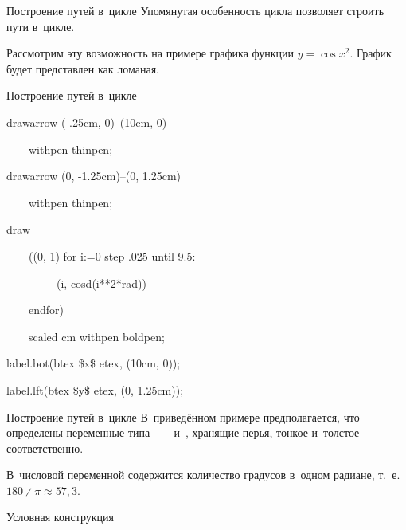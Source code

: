 \begin{frame}{Построение путей в~цикле}
Упомянутая особенность цикла  позволяет строить пути в~цикле.

Рассмотрим эту возможность на примере графика функции $y=\cos x^2$. График
будет представлен как ломаная.
\begin{center}
\end{center}
\end{frame}

\begin{frame}{Построение путей в~цикле}
\begin{programlisting}%
drawarrow (-.25cm, 0)--(10cm, 0)\par
~~~~withpen thinpen;\par
drawarrow (0, -1.25cm)--(0, 1.25cm)\par
~~~~withpen thinpen;\par
\leavevmode\par
draw\par
~~~~((0, 1) for i:=0 step .025 until 9.5:\par
~~~~~~~~--(i, cosd(i**2*rad))\par
~~~~endfor)\par
~~~~scaled cm withpen boldpen;\par
\leavevmode\par
label.bot(btex \$x\$ etex, (10cm, 0));\par
label.lft(btex \$y\$ etex, (0, 1.25cm));
\end{programlisting}
\end{frame}

\begin{frame}{Построение путей в~цикле}
В~приведённом примере предполагается, что определены переменные типа
~—  и~, хранящие перья, тонкое
и~толстое соответственно.

В~числовой переменной  содержится количество градусов в~одном
радиане, т.~е. $180{\divslash}\pi\approx57{,}3$.
\end{frame}

\begin{frame}{Условная конструкция}
\begin{flushleft}
\LARGE
{}\literal{:~}\\
\end{flushleft}
\end{frame}

